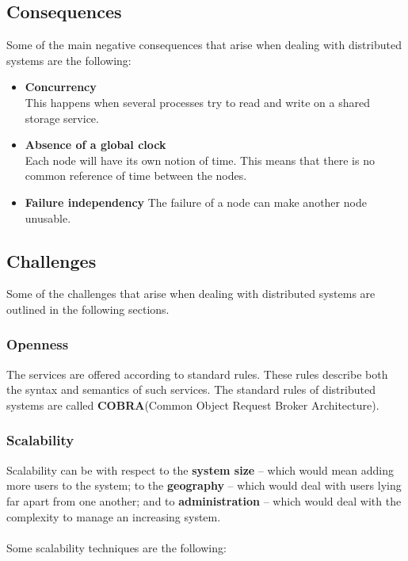 \documentclass{article}
\begin{document}
\subsection{Consequences}
Some of the main negative consequences that arise when dealing with distributed systems are the following:

\begin{itemize}
	\item \textbf{Concurrency} \\
	This happens when several processes try to read and write on a shared storage service.
	
	\item \textbf{Absence of a global clock} \\
	Each node will have its own notion of time. This means that there is no common reference of time between the nodes.
	
	\item \textbf{Failure independency}
	The failure of a node can make another node unusable.
	
\end{itemize}

\subsection{Challenges}
Some of the challenges that arise when dealing with distributed systems are outlined in the following sections.

\subsubsection{Openness}
The services are offered according to standard rules. These rules describe both the syntax and semantics of such services. The standard rules of distributed systems are called \textbf{COBRA}(Common Object Request Broker Architecture).

\subsubsection{Scalability}
Scalability can be with respect to the \textbf{system size} -- which would mean adding more users to the system; to the \textbf{geography} -- which would deal with users lying far apart from one another; and to \textbf{administration} -- which would deal with the complexity to manage an increasing system. \\ \\
Some scalability techniques are the following:
\end{document}
